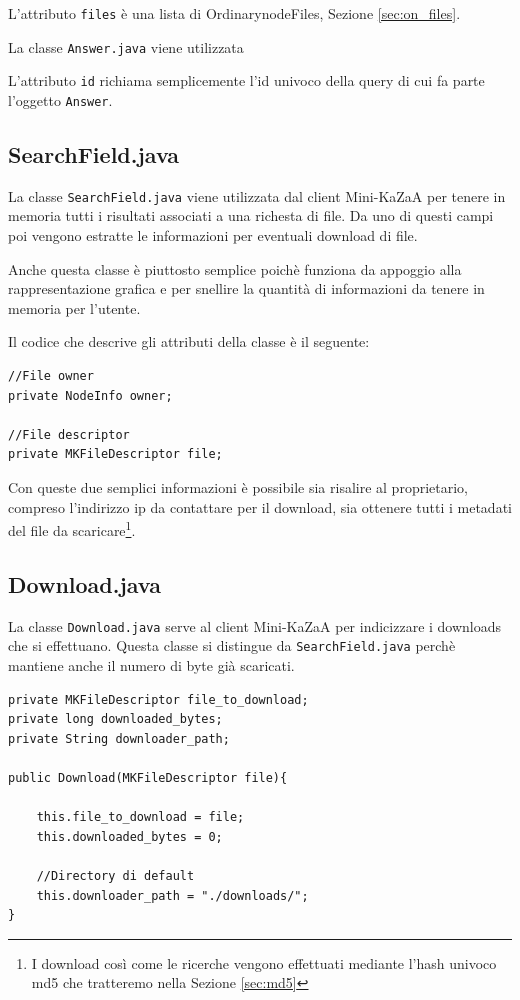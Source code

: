 L'attributo \verb|files| è una lista di OrdinarynodeFiles, Sezione \ref{sec:on_files}.

La classe \verb|Answer.java| viene utilizzata 

L'attributo \verb|id| richiama semplicemente l'id univoco della query di cui fa parte l'oggetto \verb|Answer|.

\subsection{SearchField.java}\label{sec:searchField_class}
La classe \verb|SearchField.java| viene utilizzata dal client Mini-KaZaA per tenere in memoria tutti i risultati
associati a una richesta di file.
Da uno di questi campi poi vengono estratte le informazioni per eventuali download di file.

Anche questa classe è piuttosto semplice poichè funziona da appoggio alla rappresentazione grafica e per snellire
la quantità di informazioni da tenere in memoria per l'utente.

Il codice che descrive gli attributi della classe è il seguente:
\newline
\begin{lstlisting}
//File owner
private NodeInfo owner;

//File descriptor
private MKFileDescriptor file;
\end{lstlisting}

Con queste due semplici informazioni è possibile sia risalire al proprietario, compreso l'indirizzo ip da contattare
per il download, sia ottenere tutti i metadati del file da scaricare\footnote{I download così come le ricerche vengono
effettuati mediante l'hash univoco md5 che tratteremo nella Sezione \ref{sec:md5}}.

\subsection{Download.java}\label{sec:download_class}
La classe \verb|Download.java| serve al client Mini-KaZaA per indicizzare i downloads che si effettuano. Questa classe si distingue da \verb|SearchField.java| perchè mantiene anche il numero di byte già scaricati.
\newline
\begin{lstlisting}
private MKFileDescriptor file_to_download;
private long downloaded_bytes;
private String downloader_path;

public Download(MKFileDescriptor file){

	this.file_to_download = file;
	this.downloaded_bytes = 0;

	//Directory di default
	this.downloader_path = "./downloads/";
}
\end{lstlisting}

